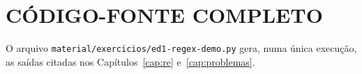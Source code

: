 \documentclass[
    12pt,
    oneside,
    a4paper,
    chapter=TITLE,
    section=TITLE,
    sumario=abnt-6027-2012
]{abntex2}
\begin{document}
\apendices

\chapter{CÓDIGO-FONTE COMPLETO}
\label{ap:codigo}

O arquivo \texttt{material/exercicios/ed1-regex-demo.py} gera, numa única execução, as saídas citadas nos Capítulos~\ref{cap:re} e~\ref{cap:problemas}.



\postextual

\end{document}
